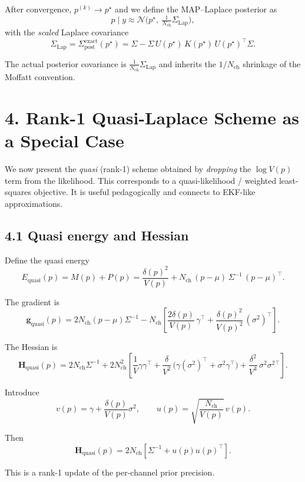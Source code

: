 \documentclass[11pt]{article}
\begin{document}
After convergence, $p^{(k)}\to p^\star$ and we define the
MAP--Laplace posterior as
\[
  p\mid y
  \approx
  \mathcal{N}\!\bigl(p^\star,\ \tfrac{1}{N_{\text{ch}}}\Sigma_{\text{Lap}}\bigr),
\]
with the \emph{scaled} Laplace covariance
\[
  \Sigma_{\text{Lap}}
  =
  \Sigma_{\text{post}}^{\text{exact}}(p^\star)
  =
  \Sigma - \Sigma\,U(p^\star)\,K(p^\star)\,U(p^\star)^\top\Sigma.
\]

The actual posterior covariance is
$\tfrac{1}{N_{\text{ch}}}\Sigma_{\text{Lap}}$ and inherits the
$1/N_{\text{ch}}$ shrinkage of the Moffatt convention.

\section*{4. Rank-1 Quasi-Laplace Scheme as a Special Case}

We now present the \emph{quasi} (rank-1) scheme obtained by \emph{dropping}
the $\log V(p)$ term from the likelihood.  This corresponds to a
quasi-likelihood / weighted least-squares objective.  It is useful
pedagogically and connects to EKF-like approximations.

\subsection*{4.1 Quasi energy and Hessian}

Define the quasi energy
\[
  E_{\text{quasi}}(p)
  =
  M(p) + P(p)
  =
  \frac{\delta(p)^2}{V(p)}
  + N_{\text{ch}}\,(p-\mu)\,\Sigma^{-1}\,(p-\mu)^\top.
\]

The gradient is
\[
  \mathbf{g}_{\text{quasi}}(p)
  =
  2N_{\text{ch}}(p-\mu)\Sigma^{-1}
  -
  N_{\text{ch}}
  \left[
    \frac{2\delta(p)}{V(p)}\,\gamma^\top
    + \frac{\delta(p)^2}{V(p)^2}\,(\sigma^2)^\top
  \right].
\]

The Hessian is
\[
  \mathbf{H}_{\text{quasi}}(p)
  =
  2N_{\text{ch}}\Sigma^{-1}
  +
  2N_{\text{ch}}^2
  \left[
    \frac{1}{V}\gamma\gamma^\top
    + \frac{\delta}{V^2}\,
      \bigl(\gamma(\sigma^2)^\top + \sigma^2\gamma^\top\bigr)
    + \frac{\delta^2}{V^3}\,\sigma^2\sigma^2{}^\top
  \right].
\]

Introduce
\[
  v(p) = \gamma + \frac{\delta(p)}{V(p)}\sigma^2,
  \qquad
  u(p) = \sqrt{\frac{N_{\text{ch}}}{V(p)}}\,v(p).
\]

Then
\[
  \mathbf{H}_{\text{quasi}}(p)
  =
  2N_{\text{ch}}
  \left[
    \Sigma^{-1}
    + u(p)u(p)^\top
  \right].
\]

This is a rank-1 update of the per-channel prior precision.
\end{document}
